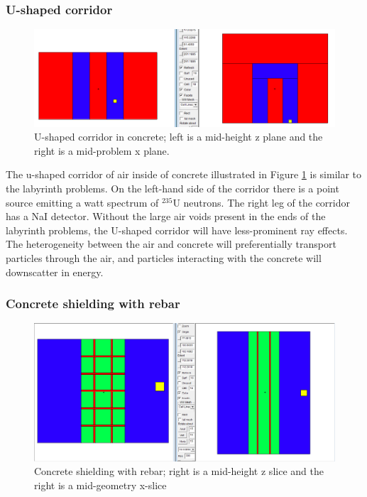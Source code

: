 \subsubsection*{U-shaped corridor}

\begin{figure}[h!]
  \centering
  \includegraphics[width=15cm]{./chapters/characterization_probs/figures/geometries/prob-2.png}
  \caption[U-shaped corridor in concrete]{U-shaped corridor in concrete; left is a mid-height z plane and the right is a mid-problem x plane.}
  \label{fig:prob2geom}
\end{figure}

The u-shaped corridor of air inside of concrete illustrated in Figure \ref{fig:prob2geom} is 
similar to the labyrinth problems. On the left-hand side of the corridor there is a point source
emitting a watt spectrum of $^{235}$U neutrons. The right leg of the corridor
has a NaI detector. Without the large air voids present in the ends of the labyrinth problems, the
U-shaped corridor will have
less-prominent ray effects. The heterogeneity between
the air and concrete will preferentially transport particles through the air,
and particles interacting with the concrete will downscatter in energy. 

\subsubsection*{Concrete shielding with rebar}

\begin{figure}[h!]
  \centering
  \includegraphics[width=15cm]{./chapters/characterization_probs/figures/geometries/prob-4.png}
  \caption[Concrete shielding with rebar]{Concrete shielding with rebar; right is a mid-height z slice and the right is a mid-geometry x-slice}
  \label{fig:prob4geom}
\end{figure}

